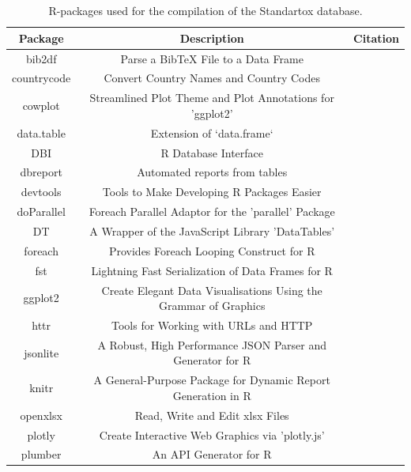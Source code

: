 \documentclass[journal,datadescriptor,accept,moreauthors,pdftex]{Definitions/mdpi}
\begin{document}
\section{}

\begin{table}[H]
    \caption{R-packages used for the compilation of the Standartox database.}
    \label{tab:rpackages}
    \centering
\begin{tabular}{ccc}
\toprule
\textbf{Package} & \textbf{Description} & \textbf{Citation} \\ 
\midrule
bib2df & Parse a BibTeX File to a Data Frame & \citep{R-bib2df} \\
countrycode & Convert Country Names and Country Codes & \citep{R-countrycode} \\
cowplot & Streamlined Plot Theme and Plot Annotations for 'ggplot2' & \citep{R-cowplot} \\
data.table & Extension of `data.frame` & \citep{R-data.table} \\
DBI & R Database Interface & \citep{R-DBI} \\
dbreport & Automated reports from tables & \citep{R-dbreport} \\
devtools & Tools to Make Developing R Packages Easier & \citep{R-devtools} \\
doParallel & Foreach Parallel Adaptor for the 'parallel' Package & \citep{R-doParallel} \\
DT & A Wrapper of the JavaScript Library 'DataTables' & \citep{R-DT} \\
foreach & Provides Foreach Looping Construct for R & \citep{R-foreach} \\
fst & Lightning Fast Serialization of Data Frames for R & \citep{R-fst} \\
ggplot2 & Create Elegant Data Visualisations Using the Grammar of Graphics & \citep{R-ggplot2} \\ httr & Tools for Working with URLs and HTTP & \citep{R-httr} \\
jsonlite & A Robust, High Performance JSON Parser and Generator for R & \citep{R-jsonlite} \\
knitr & A General-Purpose Package for Dynamic Report Generation in R & \citep{R-knitr} \\
openxlsx & Read, Write and Edit xlsx Files & \citep{R-openxlsx} \\
plotly & Create Interactive Web Graphics via 'plotly.js' & \citep{R-plotly} \\
plumber & An API Generator for R & \citep{R-plumber} \\

\end{tabular}
\end{table}
\end{document}
